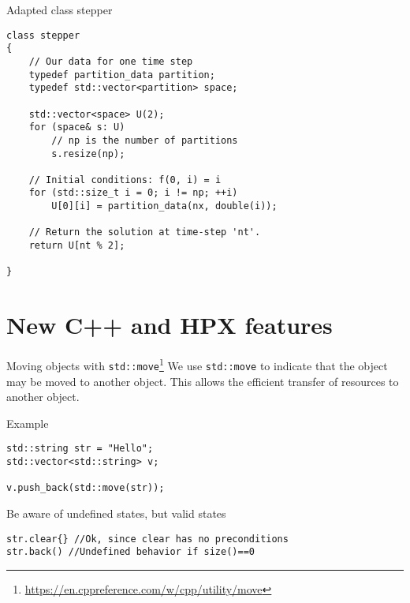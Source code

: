 \documentclass[\classoption]{beamer}
\begin{document}
\begin{frame}[fragile]{Adapted class stepper}

\begin{lstlisting}
class stepper
{
    // Our data for one time step
    typedef partition_data partition;
    typedef std::vector<partition> space;
    
    std::vector<space> U(2);
    for (space& s: U)
        // np is the number of partitions
        s.resize(np);
        
    // Initial conditions: f(0, i) = i
    for (std::size_t i = 0; i != np; ++i)
        U[0][i] = partition_data(nx, double(i));
        
    // Return the solution at time-step 'nt'.
    return U[nt % 2];
    
}
\end{lstlisting}

\end{frame}

\section{New C++ and HPX features }

\begin{frame}[fragile]{Moving objects with \lstinline|std::move|\footnote{\tiny\url{https://en.cppreference.com/w/cpp/utility/move}}} 
We use \lstinline|std::move| to indicate that the object may be moved to another object. This allows the efficient transfer of resources to another object.

\begin{block}{Example}
\begin{lstlisting}
std::string str = "Hello";
std::vector<std::string> v;

v.push_back(std::move(str));
\end{lstlisting}
\end{block}

\begin{block}{Be aware of undefined states, but valid states}
\begin{lstlisting}
str.clear{} //Ok, since clear has no preconditions
str.back() //Undefined behavior if size()==0
\end{lstlisting}
\end{block}


\end{frame}
\end{document}
